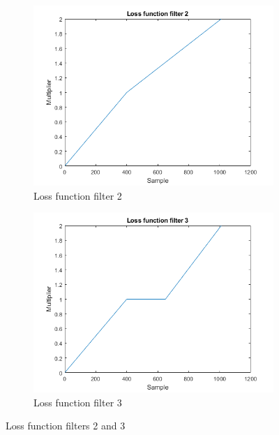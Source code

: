 \begin{figure}
    \centering
    \begin{subfigure}[b]{.45\textwidth}
        \centering
        \includegraphics[width=\textwidth]{figures/loss-2.png}
        \caption{Loss function filter 2}
        \label{sfig:me:loss2}
    \end{subfigure}
    \hfill
    \begin{subfigure}[b]{.45\textwidth}
        \centering
        \includegraphics[width=\textwidth]{figures/loss-3.png}
        \caption{Loss function filter 3}
        \label{sfig:me:loss3}
    \end{subfigure}
    \caption{Loss function filters 2 and 3}
    \label{fig:me:loss23}
\end{figure}


